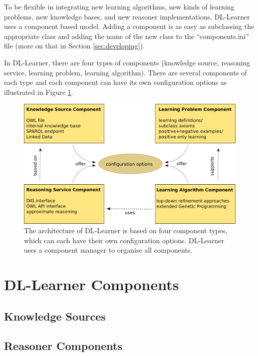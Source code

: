 \documentclass[a4paper,12pt]{scrartcl}
\begin{document}
To be flexible in integrating new learning algorithms, new kinds of learning problems, new knowledge bases, and new reasoner implementations, DL-Learner uses a component based model. Adding a component is as easy as subclassing the appropriate class and adding the name of the new class to the “components.ini” file (more on that in Section \ref{sec:developing}).

In DL-Learner, there are four types of components (knowledge source, reasoning service, learning problem, learning algorithm). There are several components of each type and each component can have its own configuration options as illustrated in Figure \ref{fig:components}.

\begin{figure}
 \includegraphics[width=\textwidth]{../../resources/components_print}
 \caption{The architecture of DL-Learner is based on four component types, which can each have their own configuration options. DL-Learner uses a component manager to organise all components.}
 \label{fig:components}
\end{figure}



\section{DL-Learner Components}

\subsection{Knowledge Sources}

\subsection{Reasoner Components}
\end{document}
